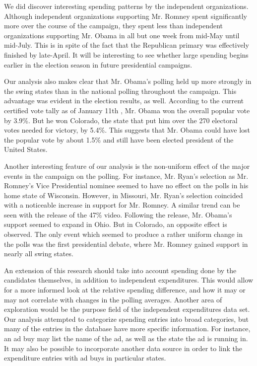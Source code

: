 \documentclass[11pt]{article}\usepackage{graphicx, color}
\begin{document}
We did discover interesting spending patterns by the independent organizations. Although independent organizations supporting Mr. Romney spent significantly more over the course of the campaign, they spent less than independent organizations supporting Mr. Obama in all but one week from mid-May until mid-July. This is in spite of the fact that the Republican primary was effectively finished by late-April. It will be interesting to see whether large spending begins earlier in the election season in future presidential campaigns.

Our analysis also makes clear that Mr. Obama's polling held up more strongly in the swing states than in the national polling throughout the campaign. This advantage was evident in the election results, as well. According to the current certified vote tally as of January 11th \cite{dw-vote}, Mr. Obama won the overall popular vote by 3.9\%. But he won Colorado, the state that put him over the 270 electoral votes needed for victory, by 5.4\%. This suggests that Mr. Obama could have lost the popular vote by about 1.5\% and still have been elected president of the United States.

Another interesting feature of our analysis is the non-uniform effect of the major events in the campaign on the polling. For instance, Mr. Ryan's selection as Mr. Romney's Vice Presidential nominee seemed to have no effect on the polls in his home state of Wisconsin. However, in Missouri, Mr. Ryan's selection coincided with a noticeable increase in support for Mr. Romney. A similar trend can be seen with the release of the 47\% video. Following the release, Mr. Obama's support seemed to expand in Ohio. But in Colorado, an opposite effect is observed. The only event which seemed to produce a rather uniform change in the polls was the first presidential debate, where Mr. Romney gained support in nearly all swing states.

An extension of this research should take into account spending done by the candidates themselves, in addition to independent expenditures. This would allow for a more informed look at the relative spending difference, and how it may or may not correlate with changes in the polling averages. Another area of exploration would be the purpose field of the independent expenditures data set. Our analysis attempted to categorize spending entries into broad categories, but many of the entries in the database have more specific information. For instance, an ad buy may list the name of the ad, as well as the state the ad is running in. It may also be possible to incorporate another data source in order to link the expenditure entries with ad buys in particular states.


\printbibliography
\end{document}
